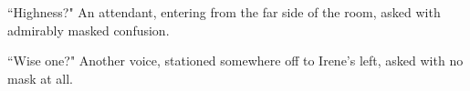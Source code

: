 \documentclass[../FGP.tex]{subfiles}
\begin{document}
\begin{fragment}
 ``Highness?" An attendant, entering from the far side of the room, asked with admirably masked confusion.

 ``Wise one?" Another voice, stationed somewhere off to Irene's left, asked with no mask at all.



















\end{fragment}
\end{document}

